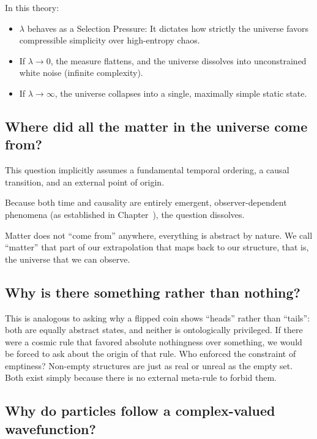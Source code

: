In this theory:
\begin{itemize}
    \item $\lambda$ behaves as a Selection Pressure: It dictates how strictly the universe favors compressible simplicity over high-entropy chaos.
    \item If $\lambda \to 0$, the measure flattens, and the universe dissolves into unconstrained white noise (infinite complexity).
    \item If $\lambda \to \infty$, the universe collapses into a single, maximally simple static state.
\end{itemize}


\subsection*{Where did all the matter in the universe come from?}

This question implicitly assumes a fundamental temporal ordering, a causal transition, and an external point of origin.

Because both time and causality are entirely emergent, observer-dependent phenomena (as established in Chapter~), the question dissolves.

Matter does not ``come from'' anywhere, everything is abstract by nature. We call ``matter'' that part of our extrapolation that maps back to
our structure, that is, the universe that we can observe.



\subsection*{Why is there something rather than nothing?}

This is analogous to asking why a flipped coin shows ``heads'' rather than ``tails'': both are equally abstract states, and neither is ontologically privileged.
If there were a cosmic rule that favored absolute nothingness over something, we would be forced to ask about the origin of that rule. Who enforced the constraint
of emptiness? Non-empty structures are just as real or unreal as the empty set. Both exist simply because there is no external meta-rule to forbid them.


\subsection*{Why do particles follow a complex-valued wavefunction?}

